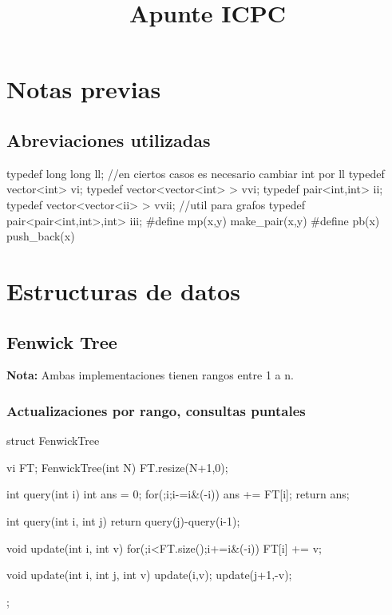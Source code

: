 \documentclass[oneside]{book}
\title{Apunte ICPC}
\begin{document}
  {
    \lstset{
        language=C++,
        basicstyle=\footnotesize\ttfamily}
  }
  {
  }


	\maketitle	
	\tableofcontents

	\frontmatter
	\chapter{Notas previas}
	\section{Abreviaciones utilizadas}
\begin{codigo}
typedef long long ll;
//en ciertos casos es necesario cambiar int por ll
typedef vector<int> vi;
typedef vector<vector<int> > vvi;
typedef pair<int,int> ii;
typedef vector<vector<ii> > vvii;		//util para grafos
typedef pair<pair<int,int>,int> iii;
#define mp(x,y) make_pair(x,y)
#define pb(x) push_back(x)
\end{codigo}

	\mainmatter
	\chapter{Estructuras de datos}
	\section{Fenwick Tree}
	\textbf{Nota:} Ambas implementaciones tienen rangos entre 1 a n.
	\subsection{Actualizaciones por rango, consultas puntales }
	\begin{codigo}
struct FenwickTree{
  vi FT;
  FenwickTree(int N){
     FT.resize(N+1,0);
  }

  int query(int i){
     int ans = 0;
     for(;i;i-=i&(-i)) ans += FT[i];
     return ans;
  }

  int query(int i, int j){
     return query(j)-query(i-1);
  }

  void update(int i, int v){
     for(;i<FT.size();i+=i&(-i)) FT[i] += v;
  }

  void update(int i, int j, int v){
     update(i,v); update(j+1,-v);
  }
};

	\end{codigo}
	\pagebreak
\end{document}

